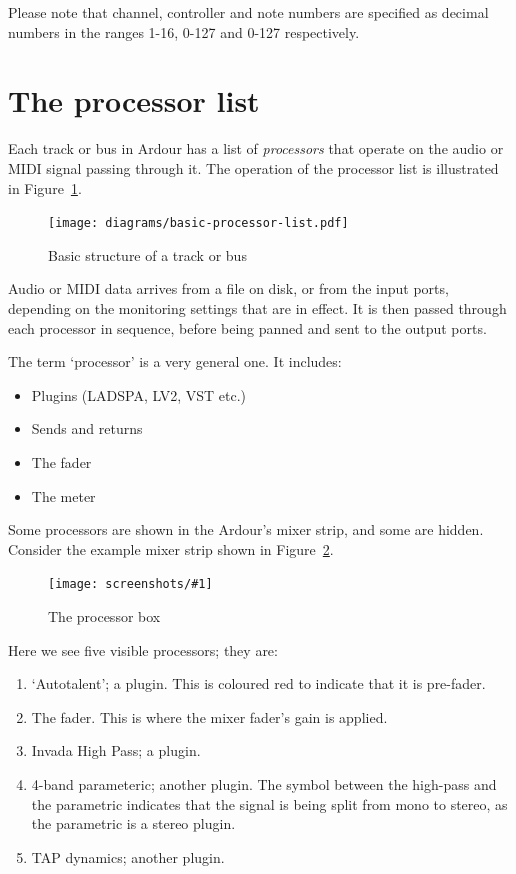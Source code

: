 \documentclass[10pt,a4paper]{book}
\newcommand{\screenshot}[3]{%
\begin{figure}[ht]%
\begin{center}
\texttt{[image: screenshots/\#1]}
\end{center}
\caption{#2}
\label{#3}
\end{figure}}
\begin{document}
Please note that channel, controller and note numbers are specified as
decimal numbers in the ranges 1-16, 0-127 and 0-127 respectively.


\section{The processor list}

Each track or bus in Ardour has a list of \emph{processors} that
operate on the audio or MIDI signal passing through it.  The operation
of the processor list is illustrated in
Figure~\ref{fig:basic-processor-list}.

\begin{figure}[ht]
\begin{center}
\texttt{[image: diagrams/basic-processor-list.pdf]}
\end{center}
\caption{Basic structure of a track or bus}
\label{fig:basic-processor-list}
\end{figure}

Audio or MIDI data arrives from a file on disk, or from the input
ports, depending on the monitoring settings that are in effect.  It is
then passed through each processor in sequence, before being panned
and sent to the output ports.

The term `processor' is a very general one.  It includes:

\begin{itemize}
\item Plugins (LADSPA, LV2, VST etc.)
\item Sends and returns
\item The fader
\item The meter
\end{itemize}

Some processors are shown in the Ardour's mixer strip, and some are
hidden.  Consider the example mixer strip shown in Figure~\ref{fig:processor-box}.

\screenshot{processor-box.png}{The processor box}{fig:processor-box}

Here we see five visible processors; they are:

\begin{enumerate}
\item `Autotalent'; a plugin.  This is coloured red to indicate
  that it is pre-fader.
\item The fader.  This is where the mixer fader's gain is applied.
\item Invada High Pass; a plugin.
\item 4-band parameteric; another plugin.  The symbol between the
  high-pass and the parametric indicates that the signal is being
  split from mono to stereo, as the parametric is a stereo plugin.
\item TAP dynamics; another plugin.
\end{enumerate}
\end{document}
